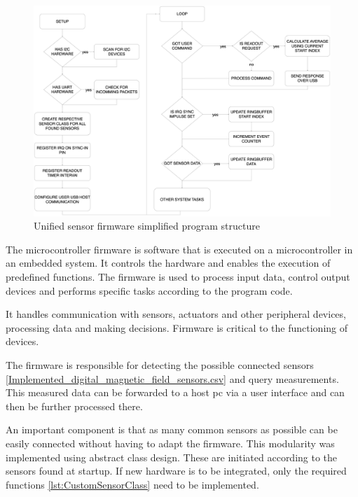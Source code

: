 \begin{figure}
\centering
\includegraphics{./generated_images/border_Unified_sensor_firmware_simplified_program_structure.png}
\caption{Unified sensor firmware simplified program structure
\label{Unified_sensor_firmware_simplified_program_structure.png}}
\end{figure}

The microcontroller firmware is software that is executed on a
microcontroller in an embedded system. It controls the hardware and
enables the execution of predefined functions. The firmware is used to
process input data, control output devices and performs specific tasks
according to the program code.

It handles communication with sensors, actuators and other peripheral
devices, processing data and making decisions. Firmware is critical to
the functioning of devices.

The firmware is responsible for detecting the possible connected sensors
\ref{Implemented_digital_magnetic_field_sensors.csv} and query
measurements. This measured data can be forwarded to a host \gls{pc} via
a user interface and can then be further processed there.

An important component is that as many common sensors as possible can be
easily connected without having to adapt the firmware. This modularity
was implemented using abstract class design. These are initiated
according to the sensors found at startup. If new hardware is to be
integrated, only the required functions \ref{lst:CustomSensorClass} need
to be implemented.

